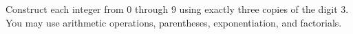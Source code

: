 Construct each integer from 0 through 9 using exactly three copies of the digit 3. You may use arithmetic operations, parentheses, exponentiation, and factorials.

